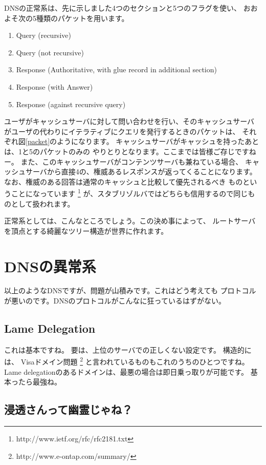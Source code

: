 DNSの正常系は、先に示しました4つのセクションと5つのフラグを使い、
おおよそ次の5種類のパケットを用います。
{\small
\begin{enumerate}
  \item Query (recursive)
  \item Query (not recursive)
  \item Response (Authoritative, with glue record in additional section)
  \item Response (with Answer)
  \item Response (against recursive query)
\end{enumerate}
}

ユーザがキャッシュサーバに対して問い合わせを行い、そのキャッシュサーバ
がユーザの代わりにイテラティブにクエリを発行するときのパケットは、
それぞれ図\ref{packet}のようになります。
キャッシュサーバがキャッシュを持ったあとは、1と5のパケットのみの
やりとりとなります。ここまでは皆様ご存じですねー。
また、このキャッシュサーバがコンテンツサーバも兼ねている場合、
キャッシュサーバから直接4の、権威あるレスポンスが返ってくることになります。
なお、権威のある回答は通常のキャッシュと比較して優先されるべき
ものということになっています
\footnote{http://www.ietf.org/rfc/rfc2181.txt}
が、スタブリゾルバではどちらも信用するので同じものとして扱われます。

正常系としては、こんなところでしょう。この決め事によって、
ルートサーバを頂点とする綺麗なツリー構造が世界に作れます。


\section { DNSの異常系 }
以上のようなDNSですが、問題が山積みです。これはどう考えても
プロトコルが悪いのです。DNSのプロトコルがこんなに狂っているはずがない。

\subsection{ Lame Delegation }
これは基本ですね。 要は、上位のサーバでの正しくない設定です。
構造的には、 Visaドメイン問題 
\footnote{http://www.e-ontap.com/summary/}
と言われているものもこれのうちのひとつですね。
Lame delegationのあるドメインは、最悪の場合は即日乗っ取りが可能です。
基本ったら最強ね。


\subsection{ 浸透さんって幽霊じゃね？ }

